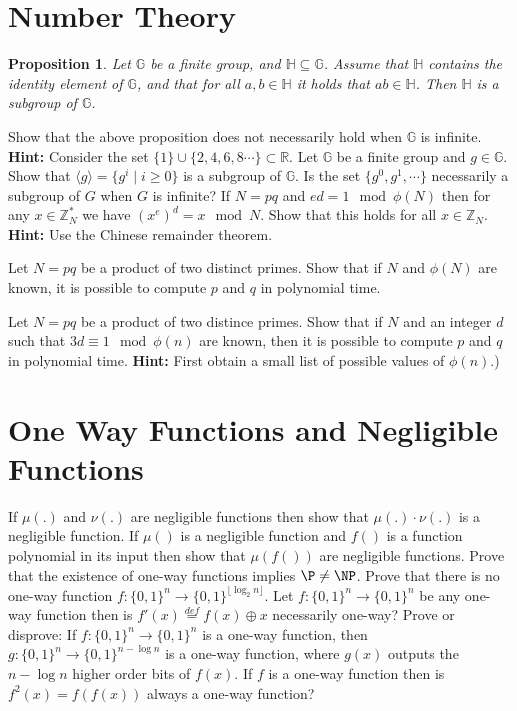 \documentclass[10pt]{exam}
\newtheorem{proposition}{Proposition}
\begin{document}
\section{Number Theory}
\begin{questions}
\question[2] \begin{proposition} Let $\mathbb{G}$ be a finite group, and $\mathbb{H}\subseteq\mathbb{G}$. Assume that $\mathbb{H}$ contains the identity element of $\mathbb{G}$, and that for all $a,b\in \mathbb{H}$ it holds that $ab\in\mathbb{H}$. Then $\mathbb{H}$ is a subgroup of $\mathbb{G}$.
\end{proposition}
Show that the above proposition does not necessarily hold when $\mathbb{G}$ is infinite. {\textbf{Hint:} Consider the set $\{1\}\cup\{2,4,6,8\cdots\}\subset \mathbb{R}$.}
\question[2] Let $\mathbb{G}$ be a  finite group and $g \in \mathbb{G}$. Show that $\langle g\rangle = \{ g^i \mid i \geq 0\}$ is a subgroup of $\mathbb{G}$. Is the set $\{g^0,g^1,\cdots \}$ necessarily a subgroup of $G$ when $G$ is infinite?
\question[2] If $N=pq$ and $ed= 1 \mod\phi(N)$ then for any $x\in\mathbb{Z}_N^*$ we have $(x^e)^d=x\mod N$. Show that this holds for all $x\in \mathbb{Z}_N$. {\textbf{Hint:} Use the Chinese remainder theorem.}







\question[2] Let $N=pq$ be a product of two distinct primes. Show that if $N$ and $\phi(N)$ are known, it is possible to compute $p$ and $q$ in polynomial time.

\question[2] Let $N=pq$ be a product of two distince primes. Show that if $N$ and an integer $d$ such that $3d \equiv 1 \mod \phi(n)$ are known, then it is possible to compute $p$ and $q$ in polynomial time. {\textbf{Hint:} First obtain a small list of possible values of $\phi(n)$.)}



\end{questions}


\section{One Way Functions and Negligible Functions}
\begin{questions}
\question[2] If $\mu(.)$ and $\nu(.)$ are negligible functions then show that $\mu(.)\cdot \nu(.)$ is a negligible function.
\question[2] If $\mu()$ is a negligible function and $f()$ is a function polynomial in its input then
show that $\mu(f())$ are negligible functions.
\question[2] Prove that the existence of one-way functions implies $\P \neq \NP$.
\question[2] Prove that there is no one-way function $f : \{0, 1\}^n \rightarrow \{0, 1\}^{\lfloor\log_2 n\rfloor}$.
\question[2] Let $f : \{0, 1\}^n \rightarrow \{0, 1\}^n$ be any one-way function then is $f'
(x) \stackrel{def}{=} f(x)\oplus x$ necessarily one-way?
\question[2] Prove or disprove: If $f : \{0, 1\}^n \rightarrow \{0, 1\}^n$ is a one-way function, then $g : \{0, 1\}^n \rightarrow \{0, 1\}^{n-\log n}$ is a one-way function, where $g(x)$ outputs the $n-\log n$ higher order bits of $f(x)$.
\question[2] If $f$ is a one-way function then is $f^2(x) = f(f(x))$ always a one-way function?  
\end{questions}
\end{document}
